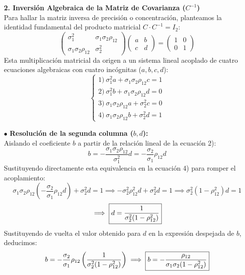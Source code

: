 \begin{ejemplo}[Deducción Explícita para la Dimensión $n = 2$]
\noindent \textbf{2. Inversión Algebraica de la Matriz de Covarianza ($C^{-1}$)} \\
Para hallar la matriz inversa de precisión o concentración, planteamos la identidad fundamental del producto matricial $C \cdot C^{-1} = I_2$:
\[
\begin{pmatrix} \sigma_1^2 & \sigma_1 \sigma_2 \rho_{12} \\ \sigma_1 \sigma_2 \rho_{12} & \sigma_2^2 \end{pmatrix} \begin{pmatrix} a & b \\ c & d \end{pmatrix} = \begin{pmatrix} 1 & 0 \\ 0 & 1 \end{pmatrix} 
\]
Esta multiplicación matricial da origen a un sistema lineal acoplado de cuatro ecuaciones algebraicas con cuatro incógnitas ($a, b, c, d$):
\[
\begin{cases}
    1) \ \sigma_1^2 a + \sigma_1 \sigma_2 \rho_{12} c = 1 \\
    2) \ \sigma_1^2 b + \sigma_1 \sigma_2 \rho_{12} d = 0 \\
    3) \ \sigma_1 \sigma_2 \rho_{12} a + \sigma_2^2 c = 0 \\
    4) \ \sigma_1 \sigma_2 \rho_{12} b + \sigma_2^2 d = 1
\end{cases}
\]

\noindent $\bullet$ \textbf{Resolución de la segunda columna ($b, d$):} \\
Aislando el coeficiente $b$ a partir de la relación lineal de la ecuación 2):
\[
b = -\frac{\sigma_1 \sigma_2 \rho_{12}}{\sigma_1^2} d = -\frac{\sigma_2}{\sigma_1} \rho_{12} d
\]
Sustituyendo directamente esta equivalencia en la ecuación 4) para romper el acoplamiento:
\[
\sigma_1 \sigma_2 \rho_{12} \left( -\frac{\sigma_2}{\sigma_1} \rho_{12} d \right) + \sigma_2^2 d = 1 \implies -\sigma_2^2 \rho_{12}^2 d + \sigma_2^2 d = 1 \implies \sigma_2^2 (1 - \rho_{12}^2) d = 1
\]
\[
\implies \framebox{$\displaystyle d = \frac{1}{\sigma_2^2 (1 - \rho_{12}^2)}$}
\]
Sustituyendo de vuelta el valor obtenido para $d$ en la expresión despejada de $b$, deducimos:
\[
b = -\frac{\sigma_2}{\sigma_1} \rho_{12} \left( \frac{1}{\sigma_2^2 (1 - \rho_{12}^2)} \right) \implies \framebox{$\displaystyle b = -\frac{\rho_{12}}{\sigma_1 \sigma_2 (1 - \rho_{12}^2)}$}
\]

\vspace{0.3cm}


\end{ejemplo}
